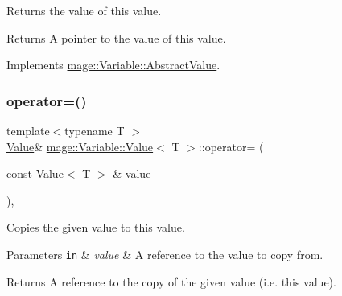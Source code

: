 Returns the value of this value.

\begin{DoxyReturn}{Returns}
A pointer to the value of this value. 
\end{DoxyReturn}


Implements \hyperlink{structmage_1_1_variable_1_1_abstract_value_aede2a77b571b80794a4254e34144f4c1}{mage\+::\+Variable\+::\+Abstract\+Value}.

\hypertarget{structmage_1_1_variable_1_1_value_a19c45282edac9ffaa0f687b7dd414392}{}\label{structmage_1_1_variable_1_1_value_a19c45282edac9ffaa0f687b7dd414392} 
\subsubsection{\texorpdfstring{operator=()}{operator=()}\hspace{0.1cm}{\footnotesize\ttfamily [1/2]}}
{\footnotesize\ttfamily template$<$typename T $>$ \\
\hyperlink{structmage_1_1_variable_1_1_value}{Value}\& \hyperlink{structmage_1_1_variable_1_1_value}{mage\+::\+Variable\+::\+Value}$<$ T $>$\+::operator= (\begin{DoxyParamCaption}\item[{const \hyperlink{structmage_1_1_variable_1_1_value}{Value}$<$ T $>$ \&}]{value }\end{DoxyParamCaption})\hspace{0.3cm}{\ttfamily [private]}, {\ttfamily [delete]}}

Copies the given value to this value.


\begin{DoxyParams}[1]{Parameters}
\mbox{\tt in}  & {\em value} & A reference to the value to copy from. \\
\hline
\end{DoxyParams}
\begin{DoxyReturn}{Returns}
A reference to the copy of the given value (i.\+e. this value). 
\end{DoxyReturn}
\hypertarget{structmage_1_1_variable_1_1_value_a2185d5eeb8f321a7e4f6d97463af4987}{}\label{structmage_1_1_variable_1_1_value_a2185d5eeb8f321a7e4f6d97463af4987} 
